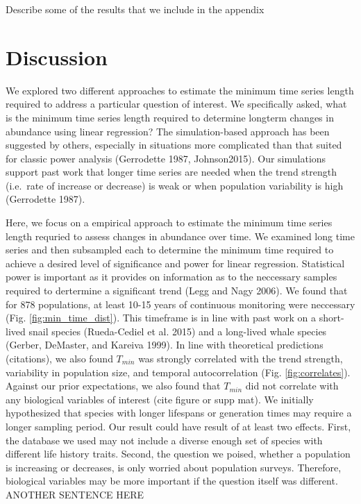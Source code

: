 \documentclass[12pt,]{article}
\begin{document}
Describe some of the results that we include in the appendix

\section{Discussion}\label{discussion}

We explored two different approaches to estimate the minimum time series
length required to address a particular question of interest. We
specifically asked, what is the minimum time series length required to
determine longterm changes in abundance using linear regression? The
simulation-based approach has been suggested by others, especially in
situations more complicated than that suited for classic power analysis
(Gerrodette 1987, Johnson2015). Our simulations support past work that
longer time series are needed when the trend strength (i.e.~rate of
increase or decrease) is weak or when population variability is high
(Gerrodette 1987).

Here, we focus on a empirical approach to estimate the minimum time
series length requried to assess changes in abundance over time. We
examined long time series and then subsampled each to determine the
minimum time required to achieve a desired level of significance and
power for linear regression. Statistical power is important as it
provides on information as to the neccessary samples required to
dertermine a significant trend (Legg and Nagy 2006). We found that for
878 populations, at least 10-15 years of continuous monitoring were
neccessary (Fig. \ref{fig:min_time_dist}). This timeframe is in line
with past work on a short-lived snail species (Rueda-Cediel et al. 2015)
and a long-lived whale species (Gerber, DeMaster, and Kareiva 1999). In
line with theoretical predictions (citations), we also found \(T_{min}\)
was strongly correlated with the trend strength, variability in
population size, and temporal autocorrelation (Fig.
\ref{fig:correlates}). Against our prior expectations, we also found
that \(T_{min}\) did not correlate with any biological variables of
interest (cite figure or supp mat). We initially hypothesized that
species with longer lifespans or generation times may require a longer
sampling period. Our result could have result of at least two effects.
First, the database we used may not include a diverse enough set of
species with different life history traits. Second, the question we
poised, whether a population is increasing or decreases, is only worried
about population surveys. Therefore, biological variables may be more
important if the question itself was different. ANOTHER SENTENCE HERE
\end{document}
